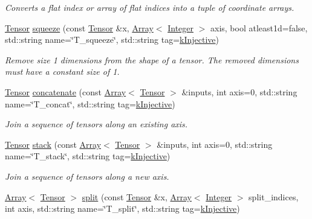 \begin{DoxyCompactItemize}
\begin{DoxyCompactList}\small\item\em Converts a flat index or array of flat indices into a tuple of coordinate arrays. \end{DoxyCompactList}\item 
\hyperlink{classtvm_1_1te_1_1Tensor}{Tensor} \hyperlink{namespacetopi_aa218ed1a5ac7bfdee53f23781184eab5}{squeeze} (const \hyperlink{classtvm_1_1te_1_1Tensor}{Tensor} \&x, \hyperlink{classtvm_1_1Array}{Array}$<$ \hyperlink{classtvm_1_1Integer}{Integer} $>$ axis, bool atleast1d=false, std\+::string name=\char`\"{}T\+\_\+squeeze\char`\"{}, std\+::string tag=\hyperlink{namespacetopi_a60f05ec416e4618d25ad00dd9f536934}{k\+Injective})
\begin{DoxyCompactList}\small\item\em Remove size 1 dimensions from the shape of a tensor. The removed dimensions must have a constant size of 1. \end{DoxyCompactList}\item 
\hyperlink{classtvm_1_1te_1_1Tensor}{Tensor} \hyperlink{namespacetopi_a3cbb849aef5a33e956412f696d7f2302}{concatenate} (const \hyperlink{classtvm_1_1Array}{Array}$<$ \hyperlink{classtvm_1_1te_1_1Tensor}{Tensor} $>$ \&inputs, int axis=0, std\+::string name=\char`\"{}T\+\_\+concat\char`\"{}, std\+::string tag=\hyperlink{namespacetopi_a60f05ec416e4618d25ad00dd9f536934}{k\+Injective})
\begin{DoxyCompactList}\small\item\em Join a sequence of tensors along an existing axis. \end{DoxyCompactList}\item 
\hyperlink{classtvm_1_1te_1_1Tensor}{Tensor} \hyperlink{namespacetopi_ad06b4b6ca055fa853c54903f6c2c7c5a}{stack} (const \hyperlink{classtvm_1_1Array}{Array}$<$ \hyperlink{classtvm_1_1te_1_1Tensor}{Tensor} $>$ \&inputs, int axis=0, std\+::string name=\char`\"{}T\+\_\+stack\char`\"{}, std\+::string tag=\hyperlink{namespacetopi_a60f05ec416e4618d25ad00dd9f536934}{k\+Injective})
\begin{DoxyCompactList}\small\item\em Join a sequence of tensors along a new axis. \end{DoxyCompactList}\item 
\hyperlink{classtvm_1_1Array}{Array}$<$ \hyperlink{classtvm_1_1te_1_1Tensor}{Tensor} $>$ \hyperlink{namespacetopi_a26a5a9917dde52a5958fee4b98ef4876}{split} (const \hyperlink{classtvm_1_1te_1_1Tensor}{Tensor} \&x, \hyperlink{classtvm_1_1Array}{Array}$<$ \hyperlink{classtvm_1_1Integer}{Integer} $>$ split\+\_\+indices, int axis, std\+::string name=\char`\"{}T\+\_\+split\char`\"{}, std\+::string tag=\hyperlink{namespacetopi_a60f05ec416e4618d25ad00dd9f536934}{k\+Injective})

\end{DoxyCompactItemize}
